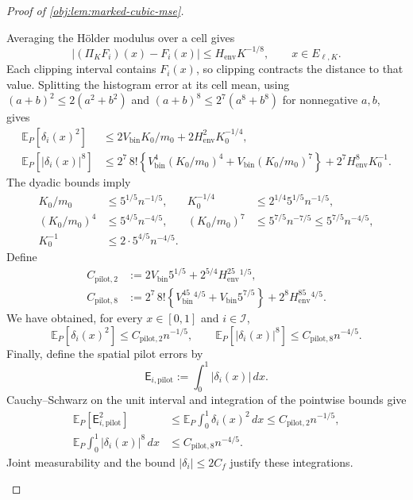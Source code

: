 \begin{proof}[Proof of \cref{obj:lem:marked-cubic-mse}]
\begin{enumerate}
Averaging the Hölder modulus over a cell gives
\[
|(\Pi_KF_i)(x)-F_i(x)|
\le H_{\mathrm{env}}K^{-1/8},
\qquad x\in E_{\ell,K}.
\]
Each clipping interval contains \(F_i(x)\), so clipping contracts the distance to that value. Splitting the histogram error at its cell mean, using
\((a+b)^2\le2(a^2+b^2)\) and
\((a+b)^8\le2^7(a^8+b^8)\) for nonnegative \(a,b\), gives
\[
\begin{aligned}
\mathbb E_P[\delta_i(x)^2]
&\le2V_{\mathrm{bin}}K_0/m_0
+2H_{\mathrm{env}}^2K_0^{-1/4},\\
\mathbb E_P[|\delta_i(x)|^8]
&\le2^7\,8!\left\{
V_{\mathrm{bin}}^4(K_0/m_0)^4
+V_{\mathrm{bin}}(K_0/m_0)^7
\right\}
+2^7H_{\mathrm{env}}^8K_0^{-1}.
\end{aligned}
\]
The dyadic bounds imply
\[
\begin{aligned}
K_0/m_0&\le5^{1/5}n^{-1/5},&
K_0^{-1/4}&\le2^{1/4}5^{1/5}n^{-1/5},\\
(K_0/m_0)^4&\le5^{4/5}n^{-4/5},&
(K_0/m_0)^7&\le5^{7/5}n^{-7/5}
\le5^{7/5}n^{-4/5},\\
K_0^{-1}&\le2\cdot5^{4/5}n^{-4/5}.
\end{aligned}
\]
Define
\[
\begin{aligned}
C_{\mathrm{pilot},2}
&:=2V_{\mathrm{bin}}5^{1/5}
+2^{5/4}H_{\mathrm{env}}^25^{1/5},\\
C_{\mathrm{pilot},8}
&:=2^7\,8!\left\{
V_{\mathrm{bin}}^45^{4/5}
+V_{\mathrm{bin}}5^{7/5}\right\}
+2^8H_{\mathrm{env}}^85^{4/5}.
\end{aligned}
\]
We have obtained, for every \(x\in[0,1]\) and \(i\in\mathcal I\),
\[
\mathbb E_P[\delta_i(x)^2]
\le C_{\mathrm{pilot},2}n^{-1/5},
\qquad
\mathbb E_P[|\delta_i(x)|^8]
\le C_{\mathrm{pilot},8}n^{-4/5}.
\]
Finally, define the spatial pilot errors by
\[
\mathsf E_{i,\mathrm{pilot}}:=\int_0^1|\delta_i(x)|\,dx.
\]
Cauchy--Schwarz on the unit interval and integration of the pointwise bounds give
\[
\begin{aligned}
\mathbb E_P[\mathsf E_{i,\mathrm{pilot}}^2]
&\le\mathbb E_P\int_0^1\delta_i(x)^2\,dx
\le C_{\mathrm{pilot},2}n^{-1/5},\\
\mathbb E_P\int_0^1|\delta_i(x)|^8\,dx
&\le C_{\mathrm{pilot},8}n^{-4/5}.
\end{aligned}
\]
Joint measurability and the bound \(|\delta_i|\le2C_f\) justify these integrations.


\end{enumerate}
\end{proof}
